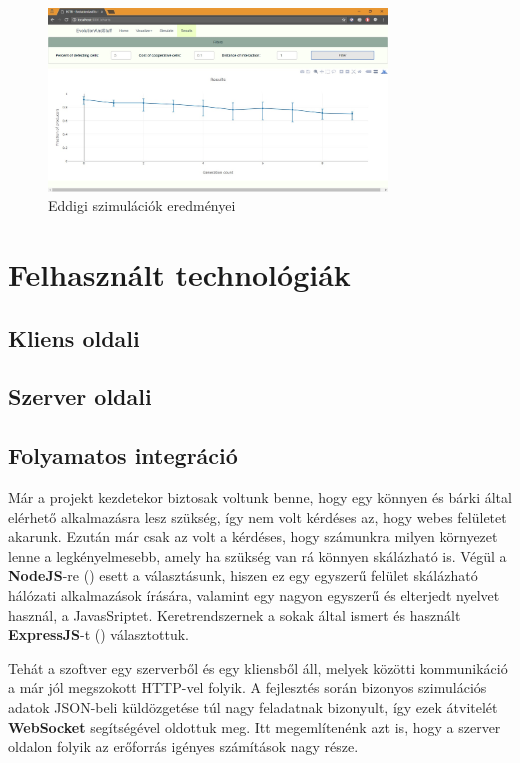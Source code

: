 \begin{figure}[ht!]
	\centering
	\includegraphics[width=90mm]{images/SimulationResults}
	\vspace*{1mm}
	\caption{Eddigi szimulációk eredményei}
	\label{fig:SimulationResults}
\end{figure}


\section{Felhasznált technológiák}

\subsection{Kliens oldali}

\subsection{Szerver oldali}

\subsection{Folyamatos integráció}

Már a projekt kezdetekor biztosak voltunk benne, hogy egy könnyen és bárki által elérhető alkalmazásra lesz szükség, így nem volt kérdéses az, hogy webes felületet akarunk. Ezután már csak az volt a kérdéses, hogy számunkra milyen környezet lenne a legkényelmesebb, amely ha szükség van rá könnyen skálázható is. Végül a \textbf{NodeJS}-re (\cite{soft:node}) esett a választásunk, hiszen ez egy egyszerű felület skálázható hálózati alkalmazások írására, valamint egy nagyon egyszerű és elterjedt nyelvet használ, a JavasSriptet. Keretrendszernek a sokak által ismert és használt \textbf{ExpressJS}-t (\cite{soft:express}) választottuk.

Tehát a szoftver egy szerverből és egy kliensből áll, melyek közötti kommunikáció a már jól megszokott HTTP-vel folyik. A fejlesztés során bizonyos szimulációs adatok JSON-beli küldözgetése túl nagy feladatnak bizonyult, így ezek átvitelét \textbf{WebSocket} segítségével oldottuk meg. Itt megemlítenénk azt is, hogy a szerver oldalon folyik az erőforrás igényes számítások nagy része.

